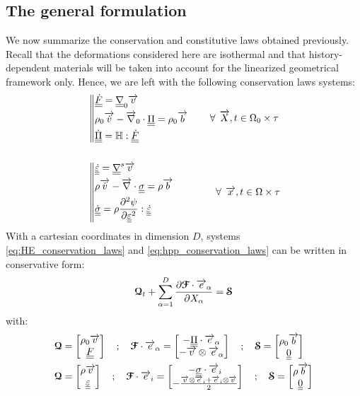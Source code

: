 \subsection{The general formulation}
We now summarize the conservation and constitutive laws obtained previously. Recall that the deformations considered here are isothermal and that history-dependent materials will be taken into account for the linearized geometrical framework only. Hence, we are left with the following conservation laws systems:
\begin{align}
  \label{eq:HE_conservation_laws}
  & \left\|
  \begin{aligned}
    & \tens{\dot{F}}=\nablat_0 \vect{v}  \\
    & \rho_0 \vect{\dot{v}} - \nablav_0 \cdot \tens{\Pi} = \rho_0 \vect{b} \\
    &  \tens{\dot{\Pi}} = \Hbb: \tens{\dot{F}}
  \end{aligned}
  \right. \qquad \forall \: \: \vect{X},t \in \Omega_0 \times \tau \\
  & \\
      \label{eq:hpp_conservation_laws}
  &\left\|
  \begin{aligned}
    & \tens{\dot{\eps}}=\nablat^s \vect{v} \\
    & \rho \vect{\dot{v}} - \nablav \cdot \tens{\sigma} = \rho \vect{b}\phantom{hjhj} \\
    & \tens{\dot{\sigma}}= \rho \ddrond{\psi}{\tens{\eps}}{\tens{\eps}} :\tens{\dot{\eps}} 
  \end{aligned}
  \right. \qquad \forall \: \: \vect{x},t \in \Omega \times \tau 
\end{align}
With a cartesian coordinates in dimension $D$, systems \eqref{eq:HE_conservation_laws} and \eqref{eq:hpp_conservation_laws} can be written in conservative form:
\begin{equation}
  \label{eq:general_quasi}
  {\boldsymbol{\mathcal{Q}}}_t + \sum_{\alpha=1}^D \frac{\partial {\boldsymbol{\mathcal{F}}}\cdot {\overrightarrow{e}}_\alpha}{\partial X_\alpha} = {\boldsymbol{\mathcal{S}}}
\end{equation}
with:
\begin{align}
  \label{eq:1}
  & {\boldsymbol{\mathcal{Q}}} =\left[\begin{matrix}\rho_0 {\overrightarrow{v}} \\ {\underline{\underline{F}}}\end{matrix}\right] \quad ; \quad {\boldsymbol{\mathcal{F}}}\cdot{\overrightarrow{e}}_\alpha = \left[\begin{matrix}-{\underline{\underline{\Pi}}}\cdot{\overrightarrow{e}}_\alpha\\-{\overrightarrow{v}}\otimes {\overrightarrow{e}}_\alpha \end{matrix}\right] \quad ; \quad {\boldsymbol{\mathcal{S}}} = \left[\begin{matrix}\rho_0 {\overrightarrow{b}} \\ {\underline{\underline{0}}}\end{matrix}\right] \\
  & {\boldsymbol{\mathcal{Q}}} =\left[\begin{matrix}\rho {\overrightarrow{v}} \\ {\underline{\underline{\varepsilon}}}\end{matrix}\right] \quad ; \quad {\boldsymbol{\mathcal{F}}}\cdot{\overrightarrow{e}}_i = \left[\begin{matrix}-{\underline{\underline{\sigma}}}\cdot{\overrightarrow{e}}_i\\-\frac{{\overrightarrow{v}}\otimes{\overrightarrow{e}}_i +{\overrightarrow{e}}_i \otimes{\overrightarrow{v}} }{2} \end{matrix}\right] \quad ; \quad {\boldsymbol{\mathcal{S}}} = \left[\begin{matrix}\rho {\overrightarrow{b}} \\ {\underline{\underline{0}}}\end{matrix}\right]
\end{align}
